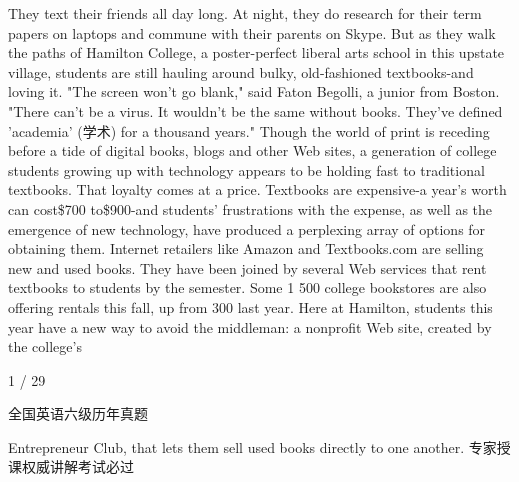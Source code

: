 \documentclass[UTF8,11pt]{ctexart}
\begin{document}
They text their friends all day long. At night, they do research for their term papers on laptops and commune with their parents on Skype. But as they walk the paths of Hamilton College, a poster-perfect liberal arts school in this upstate village, students are still hauling around bulky, old-fashioned textbooks-and loving it. "The screen won't go blank," said Faton Begolli, a junior from Boston. "There can't be a virus. It wouldn't be the same without books. They've defined 'academia' (学术) for a thousand years." Though the world of print is receding before a tide of digital books, blogs and other Web sites, a generation of college students growing up with technology appears to be holding fast to traditional textbooks. That loyalty comes at a price. Textbooks are expensive-a year's worth can cost\$700 to\$900-and students' frustrations with the expense, as well as the emergence of new technology, have produced a perplexing array of options for obtaining them. Internet retailers like Amazon and Textbooks.com are selling new and used books. They have been joined by several Web services that rent textbooks to students by the semester. Some 1 500 college bookstores are also offering rentals this fall, up from 300 last year. Here at Hamilton, students this year have a new way to avoid the middleman: a nonprofit Web site, created by the college's


1 / 29


全国英语六级历年真题


Entrepreneur Club, that lets them sell used books directly to one another. 专家授课权威讲解考试必过
\end{document}
